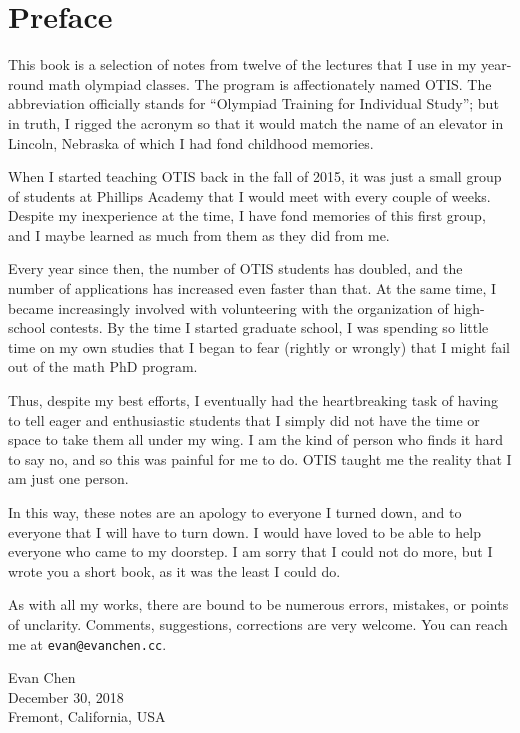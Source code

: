 \chapter{Preface}
This book is a selection of notes from twelve of the lectures
that I use in my year-round math olympiad classes.
The program is affectionately named OTIS.
The abbreviation officially stands for
``Olympiad Training for Individual Study'';
but in truth, I rigged the acronym so that it would match
the name of an elevator in Lincoln, Nebraska
of which I had fond childhood memories.

When I started teaching OTIS back in the fall of 2015,
it was just a small group of students at Phillips Academy
that I would meet with every couple of weeks.
Despite my inexperience at the time,
I have fond memories of this first group,
and I maybe learned as much from them as they did from me.

Every year since then, the number of OTIS students has doubled,
and the number of applications has increased even faster than that.
At the same time, I became increasingly involved
with volunteering with the organization of high-school contests.
By the time I started graduate school,
I was spending so little time on my own studies that
I began to fear (rightly or wrongly)
that I might fail out of the math PhD program.

Thus, despite my best efforts, I eventually had the
heartbreaking task of having to tell eager and
enthusiastic students that I simply did not have the time
or space to take them all under my wing.
I am the kind of person who finds it hard to say no,
and so this was painful for me to do.
OTIS taught me the reality that I am just one person.

In this way, these notes are an apology to everyone I turned down,
and to everyone that I will have to turn down.
I would have loved to be able to help everyone who came to my doorstep.
I am sorry that I could not do more,
but I wrote you a short book, as it was the least I could do.

As with all my works, there are bound
to be numerous errors, mistakes, or points of unclarity.
Comments, suggestions, corrections are very welcome.
You can reach me at \texttt{evan@evanchen.cc}.

\begin{flushright}
	Evan Chen \\
	December 30, 2018 \\
	Fremont, California, USA
\end{flushright}
